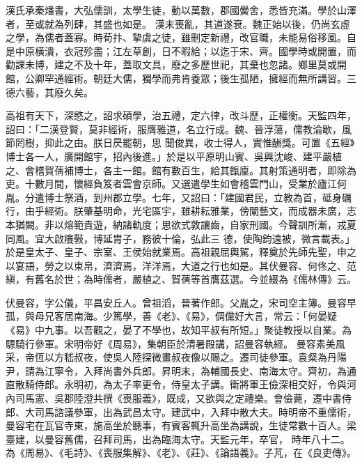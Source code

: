 
\begin{pinyinscope}

 漢氏承秦燔書，大弘儒訓，太學生徒，動以萬數，郡國黌舍，悉皆充滿。學於山澤者，至或就為列肆，其盛也如是。
 漢末喪亂，其道遂衰。魏正始以後，仍尚玄虛之學，為儒者蓋寡。時荀抃、摯虞之徒，雖刪定新禮，改官職，未能易俗移風。自是中原橫潰，衣冠殄盡；江左草創，日不暇給；以迄于宋、齊。國學時或開置，而勸課未博，建之不及十年，蓋取文具，廢之多歷世祀，其棄也忽諸。鄉里莫或開館，公卿罕通經術。朝廷大儒，獨學而弗肯養眾；後生孤陋，擁經而無所講習。三德六藝，其廢久矣。



 高祖有天下，深愍之，詔求碩學，治五禮，定六律，改斗歷，正權衡。天監四年，詔曰：「二漢登賢，莫非經術，服膺雅道，名立行成。魏、晉浮蕩，儒教淪歇，風節罔樹，抑此之由。朕日昃罷朝，思
 聞俊異，收士得人，實惟酬獎。可置《五經》博士各一人，廣開館宇，招內後進。」於是以平原明山賓、吳興沈峻、建平嚴植之、會稽賀蒨補博士，各主一館。館有數百生，給其餼廩。其射策通明者，即除為吏。十數月間，懷經負笈者雲會京師。又選遣學生如會稽雲門山，受業於廬江何胤。分遣博士祭酒，到州郡立學。七年，又詔曰：「建國君民，立教為首，砥身礪行，由乎經術。朕肇基明命，光宅區宇，雖耕耘雅業，傍闡藝文，而成器未廣，志本猶闕。非以熔範貴遊，納諸軌度；思欲式敦讓齒，自家刑國。今聲訓所漸，戎夏同風。宜大啟癢斅，博延胄子，務彼十倫，弘此三
 德，使陶鈞遠被，微言載表。」於是皇太子、皇子、宗室、王侯始就業焉。高祖親屈輿駕，釋奠於先師先聖，申之以宴語，勞之以束帛，濟濟焉，洋洋焉，大道之行也如是。其伏曼容、何佟之、范縝，有舊名於世；為時儒者，嚴植之、賀蒨等首膺茲選。今並綴為《儒林傳》云。



 伏曼容，字公儀，平昌安丘人。曾祖滔，晉著作郎。父胤之，宋司空主簿。曼容早孤，與母兄客居南海。少篤學，善《老》、《易》，倜儻好大言，常云：「何晏疑《易》中九事。以吾觀之，晏了不學也，故知平叔有所短。」聚徒教授以自業。為驃騎行參軍。宋明帝好《周易》，集朝臣於清暑殿講，詔曼容執經。
 曼容素美風采，帝恆以方嵇叔夜，使吳人陸探微畫叔夜像以賜之。遷司徒參軍。袁粲為丹陽尹，請為江寧令，入拜尚書外兵郎。昇明末，為輔國長史、南海太守。齊初，為通直散騎侍郎。永明初，為太子率更令，侍皇太子講。衛將軍王儉深相交好，令與河內司馬憲、吳郡陸澄共撰《喪服義》，既成，又欲與之定禮樂。會儉薨，遷中書侍郎、大司馬諮議參軍，出為武昌太守。建武中，入拜中散大夫。時明帝不重儒術，曼容宅在瓦官寺東，施高坐於聽事，有賓客輒升高坐為講說，生徒常數十百人。梁臺建，以曼容舊儒，召拜司馬，出為臨海太守。天監元年，卒官，
 時年八十二。為《周易》、《毛詩》、《喪服集解》、《老》、《莊》、《論語義》。子芃，在《良吏傳》。




\end{pinyinscope}
